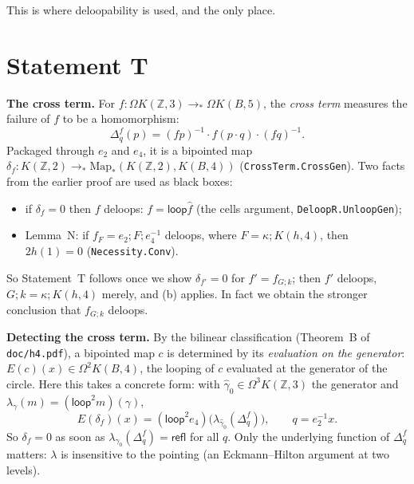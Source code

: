 \documentclass[11pt]{amsart}
\theoremstyle{definition}
\theoremstyle{remark}
\newcommand{\Om}{\Omega}
\newcommand{\Z}{\mathbb{Z}}
\newcommand{\code}[1]{\texttt{#1}}
\newcommand{\Map}{\mathrm{Map}_*}
\newcommand{\lp}{\mathsf{loop}}
\newcommand{\refl}{\mathsf{refl}}
\begin{document}
\noindent This is where deloopability is used, and the only place.

\section{Statement T}\label{s:T}

\noindent\textbf{The cross term.} For $f:\Om K(\Z,3)\to_*\Om K(B,5)$, the
\emph{cross term} measures the failure of $f$ to be a homomorphism:
\[
  \Delta^f_q(p)=(fp)^{-1}\cdot f(p\cdot q)\cdot(fq)^{-1}.
\]
Packaged through $e_2$ and $e_4$, it is a bipointed map
$\delta_f:K(\Z,2)\to_*\Map(K(\Z,2),K(B,4))$ (\code{CrossTerm.CrossGen}). Two
facts from the earlier proof are used as black boxes:
\begin{itemize}
\item[(a)] if $\delta_f=0$ then $f$ deloops: $f=\lp\hat f$ (the cells argument,
\code{DeloopR.UnloopGen});
\item[(b)] Lemma~N: if $f_F=e_2;F;e_4^{-1}$ deloops, where $F=\kappa;K(h,4)$,
then $2h(1)=0$ (\code{Necessity.Conv}).
\end{itemize}
So Statement~T follows once we show $\delta_{f'}=0$ for $f'=f_{G;k}$; then
$f'$ deloops, $G;k=\kappa;K(h,4)$ merely, and (b) applies. In fact we obtain
the stronger conclusion that $f_{G;k}$ deloops.

\smallskip\noindent\textbf{Detecting the cross term.} By the bilinear
classification (Theorem~B of \code{doc/h4.pdf}), a bipointed map $c$ is
determined by its \emph{evaluation on the generator}: $E(c)(x)\in\Om^2K(B,4)$,
the looping of $c$ evaluated at the generator of the circle. Here this takes a
concrete form: with $\hat\gamma_0\in\Om^3K(\Z,3)$ the generator and
$\lambda_\gamma(m)=(\lp^2m)(\gamma)$,
\[
  E(\delta_f)(x)=(\lp^2e_4)\big(\lambda_{\hat\gamma_0}(\Delta^f_q)\big),\qquad q=e_2^{-1}x .
\]
So $\delta_f=0$ as soon as $\lambda_{\hat\gamma_0}(\Delta^f_q)=\refl$ for all
$q$. Only the underlying function of $\Delta^f_q$ matters: $\lambda$ is
insensitive to the pointing (an Eckmann--Hilton argument at two levels).
\end{document}
